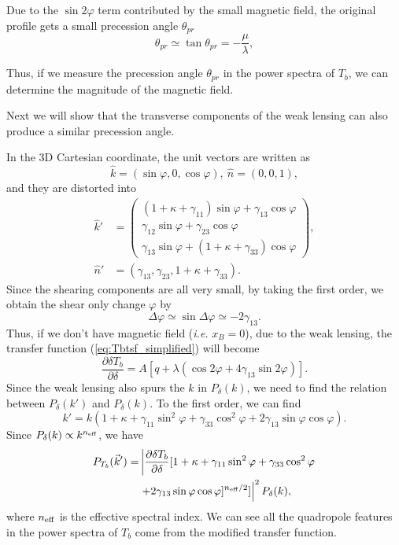 \documentclass[aps,prd,twocolumn,floatfix,showpacs,superscriptaddress,nofootinbib]{revtex4-1}
\newcommand{\ie}{{\it i.e. }}
\begin{document}
Due to the $\sin 2\varphi$ term contributed by the small magnetic field, the original profile gets a small precession angle $\theta_{pr}$
\begin{equation}
\theta_{pr}\simeq\tan\theta_{pr}=-\frac{\mu}{\lambda},
\end{equation}

Thus, if we measure the precession angle $\theta_{pr}$ in the power spectra of $T_b$, we can determine the magnitude of the magnetic field.

Next we will show that the transverse components of the weak lensing can also produce a similar precession angle.

In the 3D Cartesian coordinate, the unit vectors are written as
\begin{equation}
\hat{k}=(\sin\varphi,0,\cos\varphi),\ \hat{n}=(0,0,1),
\end{equation}
and they are distorted into
\begin{align}
\hat{k}'&=\left(\begin{array}{c}
(1+\kappa+\gamma_{11})\sin\varphi+\gamma_{13}\cos\varphi\\
\gamma_{12}\sin\varphi+\gamma_{23}\cos\varphi\\
\gamma_{13}\sin\varphi+(1+\kappa+\gamma_{33})\cos\varphi
\end{array}\right),\nonumber\\
\hat{n}'&=(\gamma_{13},\gamma_{23},1+\kappa+\gamma_{33}).
\end{align}
Since the shearing components are all very small, by taking the first order, we obtain the shear only change $\varphi$ by
\begin{equation}
\Delta\varphi\simeq\sin\Delta\varphi\simeq-2\gamma_{13}.
\end{equation}
Thus, if we don't have magnetic field (\ie $x_B=0$), due to the weak lensing, the transfer function (\ref{eq:Tbtsf_simplified}) will become
\begin{equation}
\frac{\partial\delta T_b}{\partial\delta}=A[q+\lambda(\cos 2\varphi+4\gamma_{13}\sin 2\varphi)].
\label{eq:Tbtsf_shear}
\end{equation}
Since the weak lensing also spurs the $k$ in $P_\delta(k)$, we need to find the relation between $P_\delta(k')$ and $P_\delta(k)$. To the first order, we can find
\begin{equation}
k'=k(1+\kappa+\gamma_{11}\sin^2\varphi+\gamma_{33}\cos^2\varphi+2\gamma_{13}\sin\varphi\cos\varphi).
\end{equation}
Since $P_\delta(k)\propto k^{n_{\rm eff}}$, we have
\begin{align}
P_{T_b}(\vec{k}')=&\left\vert\frac{\partial\delta T_b}{\partial\delta}[1+\kappa+\gamma_{11}\sin^2\varphi+\gamma_{33}\cos^2\varphi\right.\nonumber\\
&\left.+2\gamma_{13}\sin\varphi\cos\varphi]^{n_{\rm eff}/2}]\right\vert^2P_\delta(k),
\end{align}
where $n_{\rm eff}$ is the effective spectral index. We can see all the quadropole features in the power spectra of $T_b$ come from the modified transfer function.
\end{document}
